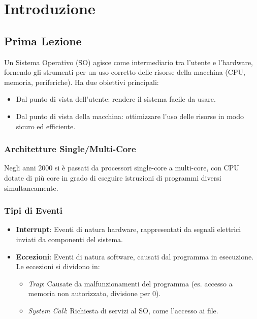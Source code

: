 \chapter{Introduzione}

\section{Prima Lezione}
Un Sistema Operativo (SO) agisce come intermediario tra l'utente e l'hardware, fornendo gli strumenti per un uso corretto delle risorse della macchina (CPU, memoria, periferiche). Ha due obiettivi principali:
\begin{itemize}
    \item Dal punto di vista dell'utente: rendere il sistema facile da usare.
    \item Dal punto di vista della macchina: ottimizzare l'uso delle risorse in modo sicuro ed efficiente.
\end{itemize}

\subsection{Architetture Single/Multi-Core}
Negli anni 2000 si è passati da processori single-core a multi-core, con CPU dotate di più core in grado di eseguire istruzioni di programmi diversi simultaneamente.

\subsection{Tipi di Eventi}
\begin{itemize}
    \item \textbf{Interrupt}: Eventi di natura hardware, rappresentati da segnali elettrici inviati da componenti del sistema.
    \item \textbf{Eccezioni}: Eventi di natura software, causati dal programma in esecuzione. Le eccezioni si dividono in:
    \begin{itemize}
        \item \textit{Trap}: Causate da malfunzionamenti del programma (es. accesso a memoria non autorizzato, divisione per 0).
        \item \textit{System Call}: Richiesta di servizi al SO, come l'accesso ai file.
    \end{itemize}
\end{itemize}

